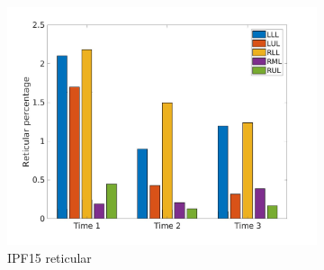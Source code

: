 \begin{figure}[H]
\begin{subfigure}{.46\linewidth}%
  \includegraphics[width=\linewidth,trim={{.0\wd0} {.0\wd0} {.0\wd0} {.0\wd0}},clip]{Appendix/Image_AppexA/LobarDistribution/IPF15ReticularLobarRegionDiseaseDistributionOverTime.jpg}
  \caption{IPF15 reticular}
  \label{fig:IPF15LobarRegionDiseaseDistributionOverTime-b}
\end{subfigure}
\begin{subfigure}{.46\linewidth}%

\end{subfigure}
\end{figure}
